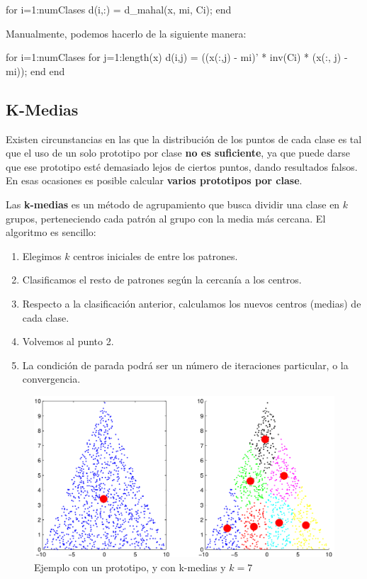 \documentclass[11pt]{scrartcl}
\begin{document}
\begin{matlabcode}
for i=1:numClases
  d(i,:) = d_mahal(x, m{i}, C{i});
end  
\end{matlabcode}

Manualmente, podemos hacerlo de la siguiente manera:

\begin{matlabcode}
for i=1:numClases
    for j=1:length(x)
       d(i,j) = ((x(:,j) - m{i})' * inv(C{i}) * (x(:, j) - m{i})); 
    end
end  
\end{matlabcode}

\subsection{K-Medias}

Existen circunstancias en las que la distribución de los puntos de cada clase es
tal que el uso de un solo prototipo por clase \textbf{no es suficiente}, ya que
puede darse que ese prototipo esté demasiado lejos de ciertos puntos, dando
resultados falsos. En esas ocasiones es posible calcular \textbf{varios
  prototipos por clase}.

Las \textbf{k-medias} es un método de agrupamiento que busca dividir una clase
en $k$ grupos, perteneciendo cada patrón al grupo con la media más cercana. El
algoritmo es sencillo:

\begin{enumerate}
\item Elegimos $k$ centros iniciales de entre los patrones.
\item Clasificamos el resto de patrones según la cercanía a los centros.
\item Respecto a la clasificación anterior, calculamos los nuevos centros
  (medias) de cada clase.
\item Volvemos al punto 2.
\item La condición de parada podrá ser un número de iteraciones particular, o la
  convergencia.
\end{enumerate}

\begin{figure}[hc!]
  \centering
  \includegraphics[width=\textwidth]{img/kmedias}
  \caption{Ejemplo con un prototipo, y con k-medias y $k=7$}
\end{figure}
\end{document}
